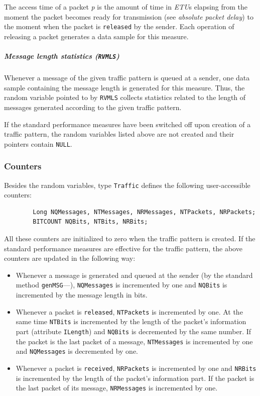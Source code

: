 The access time of a packet {\em p\/} is the amount of time in {\em ETU\/}s
elapsing from the moment the packet becomes ready for transmission
(see {\em absolute packet delay\/}) to the moment when the packet is
{\tt released} by the sender.
Each operation of releasing a packet generates a data sample for this measure.

\subparagraph*{Message length statistics ({\tt RVMLS})}

Whenever a message of the given traffic pattern is queued at a sender,
one data sample containing the message length is generated for this measure.
Thus, the random variable pointed to by {\tt RVMLS} collects statistics
related to the length of messages generated according to the given
traffic pattern.

\medskip

\noindent
If the standard performance measures have been switched off upon creation of
a traffic pattern, the random variables listed above are not created and
their pointers contain {\tt NULL}.

\subsubsection{Counters}
\label{rm_pm_cl_cn}

Besides the random variables, type {\tt Traffic} defines
the following user-accessible counters:
\begin{verbatim}
        Long NQMessages, NTMessages, NRMessages, NTPackets, NRPackets;
        BITCOUNT NQBits, NTBits, NRBits;
\end{verbatim}
All these counters are initialized to zero when the traffic pattern is created.
If the standard performance measures are effective for the traffic pattern,
the above counters are updated in the following way:
\begin{itemize}
\item
Whenever a message is generated and queued at the sender (by the standard
method {\tt genMSG}---), {\tt NQMessages} is incremented
by one and {\tt NQBits} is incremented by the message length in bits.
\item
Whenever a packet is {\tt released}, {\tt NTPackets} is incremented by
one.
At the same time {\tt NTBits} is incremented
by the length of the packet's information part (attribute {\tt ILength}) and
{\tt NQBits} is decremented by the same number.
If the packet is the last packet of a message, {\tt NTMessages} is incremented
by one
and {\tt NQMessages} is decremented by one.
\item
Whenever a packet is {\tt received}, {\tt NRPackets} is incremented by one
and {\tt NRBits} is incremented by the length of the packet's
information part.
If the packet is the last packet of its message, {\tt NRMessages} is
incremented by one.
\end{itemize}

